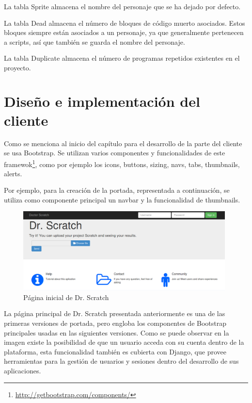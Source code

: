\documentclass[a4paper, 12pt]{book}
\begin{document}
La tabla Sprite almacena el nombre del personaje que se ha dejado por defecto.

La tabla Dead almacena el número de bloques de código muerto asociados. Estos bloques
siempre están asociados a un personaje, ya que generalmente pertenecen a scripts, así
que también se guarda el nombre del personaje.

La tabla Duplicate almacena el número de programas repetidos existentes en el proyecto.


\section{Diseño e implementación del cliente}
\label{sec:servidor}

Como se menciona al inicio del capítulo para el desarrollo de la parte del cliente se usa
Bootstrap. Se utilizan varios componentes y funcionalidades de este
 framewok\footnote{\url{http://getbootstrap.com/components/}}, como por ejemplo los icons,
buttons, sizing, navs, tabs, thumbnails, alerts.

Por ejemplo, para la creación de la portada, representada a continuación, se utiliza como
componente principal un navbar y la funcionalidad de thumbnails.

 \begin{figure}
		\graphicspath{{img/}}
    \includegraphics[bb=0 0 800 600, width=11cm, keepaspectratio]{portada.png}
		\caption{Página inicial de Dr. Scratch}
    \label{figura:foro_hilos}
 \end{figure} 

La página principal de Dr. Scratch presentada anteriormente es una de las primeras 
versiones de portada, pero engloba los componentes de Bootstrap principales 
usadas en las siguientes versiones. Como se puede observar en la imagen existe la 
posibilidad de que un usuario acceda con su cuenta dentro de la plataforma, esta
funcionalidad también es cubierta con Django, que provee herramientas para la 
gestión de usuarios y sesiones dentro del desarrollo de sus aplicaciones. \\
\end{document}
